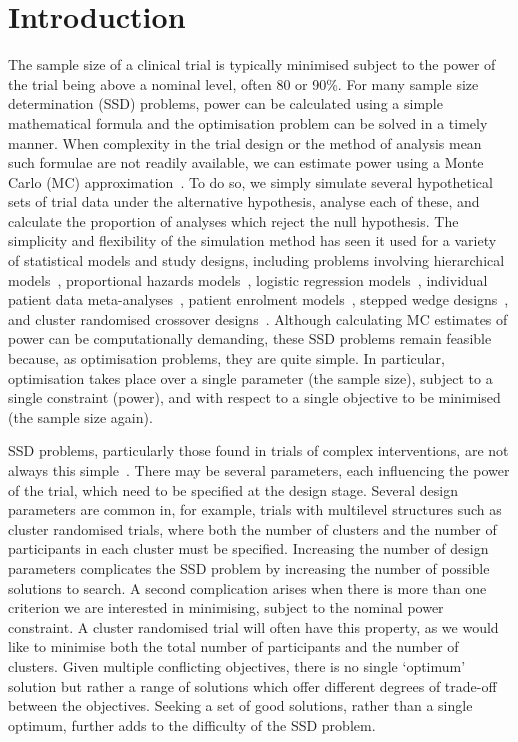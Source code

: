 \documentclass[sagev]{sagej}
\begin{document}
\section{Introduction}\label{sec:intro}

The sample size of a clinical trial is typically minimised subject to the power of the trial being above a nominal level, often 80 or 90\%. For many sample size determination (SSD) problems, power can be calculated using a simple mathematical formula and the optimisation problem can be solved in a timely manner. When complexity in the trial design or the method of analysis mean such formulae are not readily available, we can estimate power using a Monte Carlo (MC) approximation~\cite{Arnold2011, Landau2013}. To do so, we simply simulate several hypothetical sets of trial data under the alternative hypothesis, analyse each of these, and calculate the proportion of analyses which reject the null hypothesis. The simplicity and flexibility of the simulation method has seen it used for a variety of statistical models and study designs, including problems involving hierarchical models~\cite{Feng1992, Hooper2013}, proportional hazards models~\cite{Schoenfeld2005}, logistic regression models~\cite{Grieve2016}, individual patient data meta-analyses~\cite{Sutton2007, Kontopantelis2016}, patient enrolment models~\cite{Fedorov2005}, stepped wedge designs~\cite{Baio2015, Hooper2016}, and cluster randomised crossover designs~\cite{Reich2012}. Although calculating MC estimates of power can be computationally demanding, these SSD problems remain feasible because, as optimisation problems, they are quite simple. In particular, optimisation takes place over a single parameter (the sample size), subject to a single constraint (power), and with respect to a single objective to be minimised (the sample size again).

SSD problems, particularly those found in trials of complex interventions, are not always this simple~\cite{Wilson2015}. There may be several parameters, each influencing the power of the trial, which need to be specified at the design stage. Several design parameters are common in, for example, trials with multilevel structures such as cluster randomised trials, where both the number of clusters and the number of participants in each cluster must be specified. Increasing the number of design parameters complicates the SSD problem by increasing the number of possible solutions to search. A second complication arises when there is more than one criterion we are interested in minimising, subject to the nominal power constraint. A cluster randomised trial will often have this property, as we would like to minimise both the total number of participants and the number of clusters. Given multiple conflicting objectives, there is no single `optimum' solution but rather a range of solutions which offer different degrees of trade-off between the objectives. Seeking a set of good solutions, rather than a single optimum, further adds to the difficulty of the SSD problem.
\end{document}
